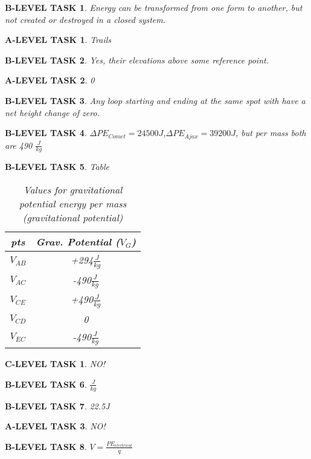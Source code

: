 \documentclass{book}
\numberwithin{equation}{section}
\newtheorem{alevel}{A-LEVEL TASK}
\newtheorem{blevel}{B-LEVEL TASK}
\newtheorem{clevel}{C-LEVEL TASK}
\theoremstyle{definition}
\begin{document}
\begin{blevel}Energy can be transformed from one form to another, but not created or destroyed in a closed system.\end{blevel}
\begin{alevel}Trails\end{alevel}
\begin{blevel}Yes, their elevations above some reference point.\end{blevel}
\begin{alevel}0\end{alevel}
\begin{blevel}Any loop starting and ending at the same spot with have a net height change of zero.\end{blevel}
\begin{blevel}$\Delta PE_{Comet}=24500J$,$\Delta PE_{Ajax}=39200J$, but per mass both are 490 $\frac{J}{kg}$\end{blevel}

\begin{blevel} Table\par
\begin{table}[H]
\begin{center}
\begin{tabular}{|c|c|}\hline
pts&Grav. Potential ($V_G$)\\ \hline
$V_{AB}$& +294$\frac{J}{kg}$\\ \hline
$V_{AC}$& -490$\frac{J}{kg}$\\ \hline
$V_{CE}$& +490$\frac{J}{kg}$\\ \hline
$V_{CD}$& 0\\ \hline
$V_{EC}$& -490$\frac{J}{kg}$\\ \hline
\end{tabular}
\caption{Values for gravitational potential energy per mass (gravitational potential)}
\label{T:2GP}
\end{center}
\end{table}
\end{blevel}

\begin{clevel}NO!\end{clevel}
\begin{blevel}$\frac{J}{kg}$\end{blevel}
\begin{blevel}22.5J\end{blevel}
\begin{alevel}NO!\end{alevel}
\begin{blevel}$V=\frac{PE_{electrical}}{q}$\end{blevel}
\end{document}
